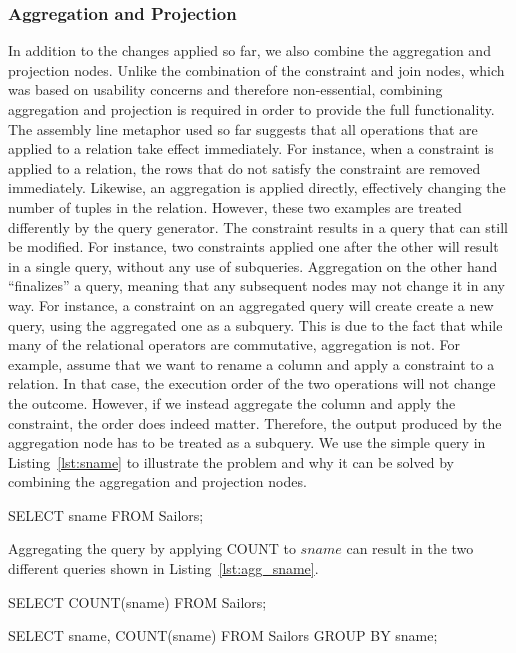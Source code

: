 \documentclass[11pt,a4paper]{globis-book}
\begin{document}
\subsubsection*{Aggregation and Projection}
In addition to the changes applied so far, we also combine the aggregation and projection nodes. Unlike the combination of the constraint and join nodes, which was based on usability concerns and therefore non-essential, combining aggregation and projection is required in order to provide the full functionality. The assembly line metaphor used so far suggests that all operations that are applied to a relation take effect immediately. For instance, when a constraint is applied to a relation, the rows that do not satisfy the constraint are removed immediately. Likewise, an aggregation is applied directly, effectively changing the number of tuples in the relation. However, these two examples are treated differently by the query generator. The constraint results in a query that can still be modified. For instance, two constraints applied one after the other will result in a single query, without any use of subqueries. Aggregation on the other hand ``finalizes'' a query, meaning that any subsequent nodes may not change it in any way. For instance, a constraint on an aggregated query will create create a new query, using the aggregated one as a subquery. This is due to the fact that while many of the relational operators are commutative, aggregation is not. For example, assume that we want to rename a column and apply a constraint to a relation. In that case, the execution order of the two operations will not change the outcome. However, if we instead aggregate the column and apply the constraint, the order does indeed matter. Therefore, the output produced by the aggregation node has to be treated as a subquery. We use the simple query in Listing~\ref{lst:sname} to illustrate the problem and why it can be solved by combining the aggregation and projection nodes.

\begin{codeex}[caption=Example query,label=lst:sname]
SELECT sname
FROM Sailors;
\end{codeex}

Aggregating the query by applying COUNT to $sname$ can result in the two different queries shown in Listing~\ref{lst:agg_sname}.

\begin{codeex}[caption=Possible results of applying COUNT to \textit{sname}, label=lst:agg_sname]
SELECT COUNT(sname)
FROM Sailors;

SELECT sname, COUNT(sname)
FROM Sailors
GROUP BY sname;
\end{codeex}
\end{document}
